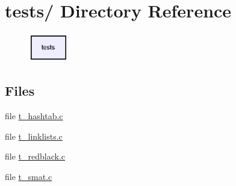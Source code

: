 \hypertarget{dir_000000}{
\section{tests/ Directory Reference}
\label{dir_000000}
}




\begin{figure}[H]
\begin{center}
\leavevmode
\includegraphics[width=49pt]{dir_000000_dep}
\end{center}
\end{figure}
\subsection*{Files}
\begin{CompactItemize}
\item 
file \hyperlink{t__hashtab_8c}{t\_\-hashtab.c}
\item 
file \hyperlink{t__linklists_8c}{t\_\-linklists.c}
\item 
file \hyperlink{t__redblack_8c}{t\_\-redblack.c}
\item 
file \hyperlink{t__smat_8c}{t\_\-smat.c}
\end{CompactItemize}
